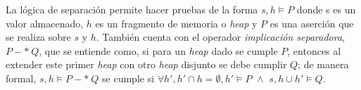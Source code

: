 La lógica de separación permite hacer pruebas de la forma $s,h
\vDash P$ donde s es un valor almacenado, $h$ es un fragmento de memoria o
\textit{heap} y $P$ es una aserción que se realiza sobre $s$ y $h$. También cuenta
con el operador \textit{implicación separadora}, $P-*\ Q$, que se entiende como, si
para un \textit{heap} dado se cumple $P$, entonces al extender este primer
\textit{heap} con otro \textit{heap} disjunto se debe cumplir $Q$; de manera
formal, $s, h \vDash P-*\ Q$ se cumple si $\forall h', h' \cap h = \emptyset, h' \vDash
P\,\, \land \,\, s, h \cup h' \vDash Q$.
